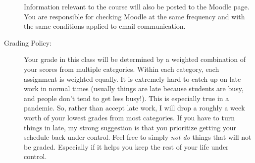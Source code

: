 \documentclass[12pt]{article}
\begin{document}
\begin{description}
  Information relevant to the course will also be posted to the Moodle page. You are responsible for checking Moodle at the same frequency and with the same conditions applied to email communication.

\item[Grading Policy:]
  Your grade in this class will be determined by a weighted combination of your scores from multiple categories. Within each category, each assignment is weighted equally. It is extremely hard to catch up on late work in normal times (usually things are late because students are busy, and people don't tend to get less busy!). This is especially true in a pandemic. So, rather than accept late work, I will drop a roughly a week worth of your lowest grades from most categories. If you have to turn things in late, my strong suggestion is that you prioritize getting your schedule back under control. Feel free to simply \textit{not do} things that will not be graded. Especially if it helps you keep the rest of your life under control.



\end{description}
\end{document}

